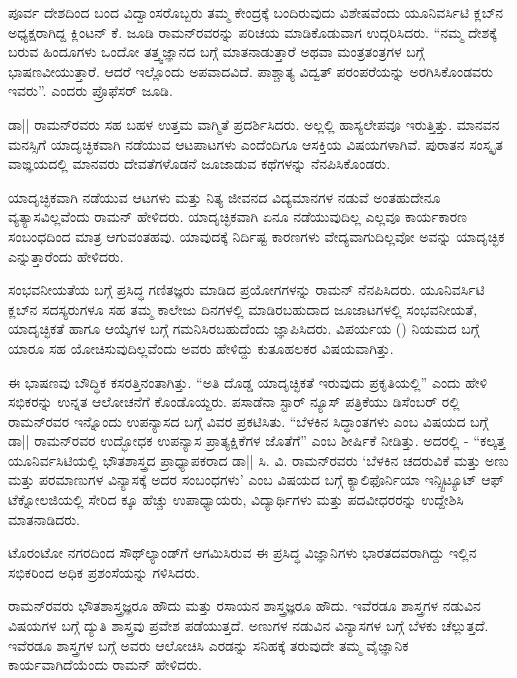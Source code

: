 ಪೂರ್ವ ದೇಶದಿಂದ ಬಂದ ವಿದ್ವಾಂಸರೊಬ್ಬರು ತಮ್ಮ ಕೇಂದ್ರಕ್ಕೆ ಬಂದಿರುವುದು ವಿಶೇಷವೆಂದು ಯೂನಿವರ್ಸಿಟಿ ಕ್ಲಬ್‍ನ ಅಧ್ಯಕ್ಷರಾಗಿದ್ದ ಕ್ಲಿಂಟನ್ ಕೆ. ಜೂಡಿ ರಾಮನ್‍ರವರನ್ನು ಪರಿಚಯ ಮಾಡಿಕೊಡುವಾಗ ಉದ್ಗರಿಸಿದರು. “ನಮ್ಮ ದೇಶಕ್ಕೆ ಬರುವ ಹಿಂದೂಗಳು ಒಂದೋ ತತ್ತ್ವಜ್ಞಾನದ ಬಗ್ಗೆ ಮಾತನಾಡುತ್ತಾರೆ ಅಥವಾ ಮಂತ್ರ\enginline{-}ತಂತ್ರಗಳ ಬಗ್ಗೆ ಭಾಷಣವೀಯುತ್ತಾರೆ. ಆದರೆ ಇಲ್ಲೊಂದು ಅಪವಾದವಿದೆ. ಪಾಶ್ಚಾತ್ಯ ವಿದ್ವತ್ ಪರಂಪರೆಯನ್ನು ಅರಗಿಸಿಕೊಂಡವರು ಇವರು”. ಎಂದರು ಪ್ರೊಫೆಸರ್ ಜೂಡಿ.

ಡಾ|| ರಾಮನ್‍ರವರು ಸಹ ಬಹಳ ಉತ್ತಮ ವಾಗ್ಮಿತೆ ಪ್ರದರ್ಶಿಸಿದರು. ಅಲ್ಲಲ್ಲಿ ಹಾಸ್ಯಲೇಪವೂ ಇರುತ್ತಿತ್ತು. ಮಾನವನ ಮನಸ್ಸಿಗೆ ಯಾದೃಚ್ಛಿಕವಾಗಿ ನಡೆಯುವ ಆಟ\enginline{-}ಪಾಟಗಳು ಎಂದೆಂದಿಗೂ ಆಸಕ್ತಿಯ ವಿಷಯಗಳಾಗಿವೆ. ಪುರಾತನ ಸಂಸ್ಕೃತ ವಾಙ್ಞಯದಲ್ಲಿ ಮಾನವರು ದೇವತೆಗಳೊಡನೆ ಜೂಜಾಡುವ ಕಥೆಗಳನ್ನು ನೆನಪಿಸಿಕೊಂಡರು.

ಯಾದೃಚ್ಛಿಕವಾಗಿ ನಡೆಯುವ ಆಟಗಳು ಮತ್ತು ನಿತ್ಯ ಜೀವನದ ವಿದ್ಯಮಾನಗಳ ನಡುವೆ ಅಂತಹುದೇನೂ ವ್ಯತ್ಯಾಸವಿಲ್ಲವೆಂದು ರಾಮನ್ ಹೇಳಿದರು. ಯಾದೃಚ್ಛಿಕವಾಗಿ ಏನೂ ನಡೆಯುವುದಿಲ್ಲ ಎಲ್ಲವೂ ಕಾರ್ಯಕಾರಣ ಸಂಬಂಧದಿಂದ ಮಾತ್ರ ಆಗುವಂತಹವು. ಯಾವುದಕ್ಕೆ ನಿರ್ದಿಷ್ಟ ಕಾರಣಗಳು ವೇದ್ಯವಾಗುದಿಲ್ಲವೋ ಅವನ್ನು ಯಾದೃಚ್ಛಿಕ ಎನ್ನುತ್ತಾರೆಂದು ಹೇಳಿದರು.

ಸಂಭವನೀಯತೆಯ ಬಗ್ಗೆ ಪ್ರಸಿದ್ಧ ಗಣಿತಜ್ಞರು ಮಾಡಿದ ಪ್ರಯೋಗಗಳನ್ನು ರಾಮನ್ ನೆನಪಿಸಿದರು. ಯೂನಿವರ್ಸಿಟಿ ಕ್ಲಬ್‍ನ ಸದಸ್ಯರುಗಳೂ ಸಹ ತಮ್ಮ ಕಾಲೇಜು ದಿನಗಳಲ್ಲಿ ಮಾಡಿರಬಹುದಾದ ಜೂಜಾಟಗಳಲ್ಲಿ ಸಂಭವನೀಯತೆ, ಯಾದೃಚ್ಛಿಕತೆ ಹಾಗೂ ಆಯ್ಕೆಗಳ ಬಗ್ಗೆ ಗಮನಿಸಿರಬಹುದೆಂದು ಜ್ಞಾಪಿಸಿದರು. ವಿಪರ್ಯಯ () ನಿಯಮದ ಬಗ್ಗೆ ಯಾರೂ ಸಹ ಯೋಚಿಸುವುದಿಲ್ಲವೆಂದು ಅವರು ಹೇಳಿದ್ದು ಕುತೂಹಲಕರ ವಿಷಯವಾಗಿತ್ತು.

ಈ ಭಾಷಣವು ಬೌದ್ಧಿಕ ಕಸರತ್ತಿನಂತಾಗಿತ್ತು. “ಅತಿ ದೊಡ್ಡ ಯಾದೃಚ್ಛಿಕತೆ ಇರುವುದು ಪ್ರಕೃತಿಯಲ್ಲಿ” ಎಂದು ಹೇಳಿ ಸಭಿಕರನ್ನು ಉನ್ನತ ಆಲೋಚನೆಗೆ ಕೊಂಡೊಯ್ದರು. ಪಸಾಡೆನಾ ಸ್ಟಾರ್ ನ್ಯೂಸ್ ಪತ್ರಿಕೆಯು  ಡಿಸೆಂಬರ್ ರಲ್ಲಿ ರಾಮನ್‍ರವರ ಇನ್ನೊಂದು ಉಪನ್ಯಾಸದ ಬಗ್ಗೆ ವಿವರ ಪ್ರಕಟಿಸಿತು. “ಬೆಳಕಿನ ಸಿದ್ಧಾಂತಗಳು ಎಂಬ ವಿಷಯದ ಬಗ್ಗೆ ಡಾ|| ರಾಮನ್‍ರವರ ಉದ್ಭೋಧಕ ಉಪನ್ಯಾಸ ಪ್ರಾತ್ಯಕ್ಷಿಕೆಗಳ ಜೊತೆಗೆ” ಎಂಬ ಶೀರ್ಷಿಕೆ ನೀಡಿತ್ತು. ಅದರಲ್ಲಿ - “ಕಲ್ಕತ್ತ ಯೂನಿರ್ವಸಿಟಿಯಲ್ಲಿ ಭೌತಶಾಸ್ತ್ರದ ಪ್ರಾಧ್ಯಾಪಕರಾದ ಡಾ|| ಸಿ. ವಿ. ರಾಮನ್‍ರವರು ‘ಬೆಳಕಿನ ಚದರುವಿಕೆ ಮತ್ತು ಅಣು ಮತ್ತು ಪರಮಾಣುಗಳ ವಿನ್ಯಾಸಕ್ಕೆ ಅದರ ಸಂಬಂಧಗಳು’ ಎಂಬ ವಿಷಯದ ಬಗ್ಗೆ ಕ್ಯಾಲಿಫೊರ್ನಿಯಾ ಇನ್ಸ್ಟಿಟ್ಯೂಟ್ ಆಫ್ ಟೆಕ್ನೋಲಜಿಯಲ್ಲಿ ಸೇರಿದ  ಕ್ಕೂ ಹೆಚ್ಚು ಉಪಾಧ್ಯಾಯರು, ವಿದ್ಯಾರ್ಥಿಗಳು ಮತ್ತು ಪದವೀಧರರನ್ನು ಉದ್ದೇಶಿಸಿ ಮಾತನಾಡಿದರು.

ಟೊರಂಟೋ ನಗರದಿಂದ ಸೌಥ್‍ಲ್ಯಾಂಡ್‍ಗೆ ಆಗಮಿಸಿರುವ ಈ ಪ್ರಸಿದ್ಧ ವಿಜ್ಞಾನಿಗಳು ಭಾರತದವರಾಗಿದ್ದು ಇಲ್ಲಿನ ಸಭಿಕರಿಂದ ಅಧಿಕ ಪ್ರಶಂಸೆಯನ್ನು ಗಳಿಸಿದರು.

ರಾಮನ್‍ರವರು ಭೌತಶಾಸ್ತ್ರಜ್ಞರೂ ಹೌದು ಮತ್ತು ರಸಾಯನ ಶಾಸ್ತ್ರಜ್ಞರೂ ಹೌದು. ಇವೆರಡೂ ಶಾಸ್ತ್ರಗಳ ನಡುವಿನ ವಿಷಯಗಳ ಬಗ್ಗೆ ದ್ಯುತಿ ಶಾಸ್ತ್ರವು ಪ್ರವೇಶ ಪಡೆಯುತ್ತದೆ. ಅಣುಗಳ ನಡುವಿನ ವಿನ್ಯಾಸಗಳ ಬಗ್ಗೆ ಬೆಳಕು ಚೆಲ್ಲುತ್ತದೆ. ಇವೆರಡೂ ಶಾಸ್ತ್ರಗಳ ಬಗ್ಗೆ ಅವರು ಆಲೋಚಿಸಿ ಎರಡನ್ನು ಸನಿಹಕ್ಕೆ ತರುವುದೇ ತಮ್ಮ ವೈಜ್ಞಾನಿಕ ಕಾರ್ಯವಾಗಿದೆಯೆಂದು ರಾಮನ್ ಹೇಳಿದರು.

